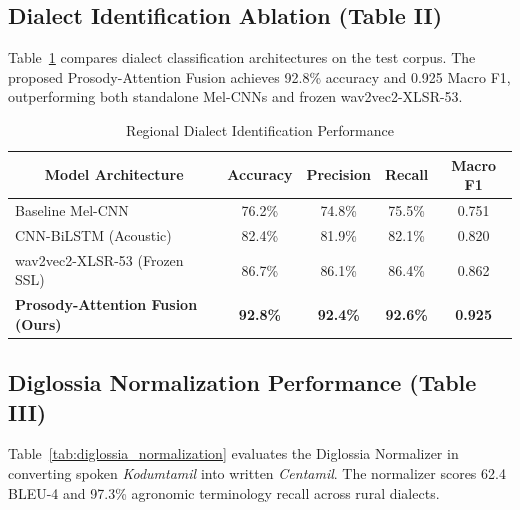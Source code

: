 \documentclass[conference]{IEEEtran}
\begin{document}
\subsection{Dialect Identification Ablation (Table II)}
Table~\ref{tab:dialect_identification} compares dialect classification architectures on the test corpus. The proposed Prosody-Attention Fusion achieves 92.8\% accuracy and 0.925 Macro F1, outperforming both standalone Mel-CNNs and frozen wav2vec2-XLSR-53.

\begin{table}[t]
\centering
\caption{Regional Dialect Identification Performance}
\label{tab:dialect_identification}
\begin{tabular}{|l|c|c|c|c|}
\hline
\multicolumn{1}{|c|}{\textbf{Model Architecture}} & \textbf{Accuracy} & \textbf{Precision} & \textbf{Recall} & \textbf{Macro F1} \\
\hline
Baseline Mel-CNN                  & 76.2\% & 74.8\% & 75.5\% & 0.751 \\
\hline
CNN-BiLSTM (Acoustic)             & 82.4\% & 81.9\% & 82.1\% & 0.820 \\
\hline
wav2vec2-XLSR-53 (Frozen SSL)     & 86.7\% & 86.1\% & 86.4\% & 0.862 \\
\hline
\textbf{Prosody-Attention Fusion (Ours)} & \textbf{92.8\%} & \textbf{92.4\%} & \textbf{92.6\%} & \textbf{0.925} \\
\hline
\end{tabular}
\end{table}

\subsection{Diglossia Normalization Performance (Table III)}
Table~\ref{tab:diglossia_normalization} evaluates the Diglossia Normalizer in converting spoken \textit{Kodumtamil} into written \textit{Centamil}. The normalizer scores 62.4 BLEU-4 and 97.3\% agronomic terminology recall across rural dialects.
\end{document}
